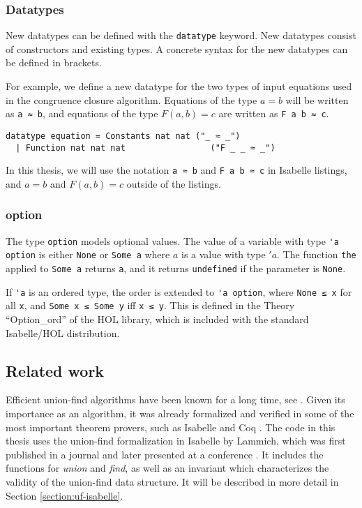 \subsubsection{Datatypes}
\label{subsubsection:datatypes}

New datatypes can be defined with the \lstinline|datatype| keyword. New datatypes consist of constructors and existing types. A concrete syntax for the new datatypes can be defined in brackets.

For example, we define a new datatype for the two types of input equations used in the congruence closure algorithm. Equations of the type $a = b$ will be written as \lstinline{a ≈ b}, and equations of the type $F(a, b) = c$ are written as \lstinline{F a b ≈ c}.

\begin{lstlisting}
datatype equation = Constants nat nat ("_ ≈ _")
  | Function nat nat nat                 ("F _ _ ≈ _")
\end{lstlisting}

In this thesis, we will use the notation \lstinline{a ≈ b} and \lstinline{F a b ≈ c} in Isabelle listings, and $a = b$ and $F(a, b) = c$ outside of the listings.

\subsubsection{option}

The type \lstinline{option} models optional values. The value of a variable with type \lstinline{'a option} is either \lstinline|None| or \lstinline|Some a| where $a$ is a value with type $'a$. The function \lstinline|the| applied to \lstinline|Some a| returns \lstinline|a|, and it returns \lstinline|undefined| if the parameter is \lstinline|None|.

If \lstinline{'a} is an ordered type, the order is extended to \lstinline{'a option}, where \lstinline{None ≤ x} for all \lstinline|x|, and \lstinline{Some x ≤ Some y} iff \lstinline{x ≤ y}. This is defined in the Theory ``Option\_ord'' of the HOL library, which is included with the standard Isabelle/HOL distribution.

\subsection{Related work}

Efficient union-find algorithms have been known for a long time, see \cite{unionfind-og, Tarjan}. Given its importance as an algorithm, it was already formalized and verified in some of the most important theorem provers, such as Isabelle and Coq \cite{unionfind-persistent}. The code in this thesis uses the union-find formalization in Isabelle by Lammich, which was first published in a journal \cite{unionfind-isabelle} and later presented at a conference \cite{unionfind-isabelle-conference}. It includes the functions for \emph{union} and \emph{find}, as well as an invariant which characterizes the validity of the union-find data structure. It will be described in more detail in Section \ref{section:uf-isabelle}.

